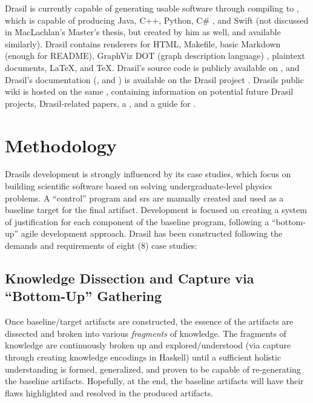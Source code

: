Drasil is currently capable of generating usable software through compiling to
, which is capable of producing Java, C++, Python, C\#
\cite{MacLachlan2020}, and Swift (not discussed in MacLachlan's Master's thesis,
but created by him as well, and available similarly). Drasil contains renderers
for HTML, Makefile, basic Markdown (enough for README), GraphViz DOT (graph
description language) \cite{Gansner1993}, plaintext documents, \LaTeX{}, and
\TeX{}. Drasil's source code is publicly available on
, and Drasil's
documentation
(,
and
)
is available on the Drasil project
. Drasils public
wiki is hosted on the same , containing
information on potential future Drasil projects, Drasil-related papers, a
, and a
guide for .

\section{Methodology}

Drasils development is strongly influenced by its case studies, which focus on
building scientific software based on solving undergraduate-level physics
problems. A ``control'' program and \acs{srs} are manually created and used as a
baseline target for the final artifact. Development is focused on creating a
system of justification for each component of the baseline program, following a
``bottom-up'' agile 
development approach. Drasil has been constructed following the demands and
requirements of eight (8) case studies:

\caseStudiesTable

\subsection{Knowledge Dissection and Capture via ``Bottom-Up'' Gathering}

Once baseline/target artifacts are constructed, the essence of the artifacts are
dissected and broken into various \textit{fragments} of knowledge. The fragments
of knowledge are continuously broken up and explored/understood (via capture
through creating knowledge encodings in Haskell) until a sufficient holistic
understanding is formed, generalized, and proven to be capable of re-generating
the baseline artifacts. Hopefully, at the end, the baseline artifacts will have
their flaws highlighted and resolved in the produced artifacts.

